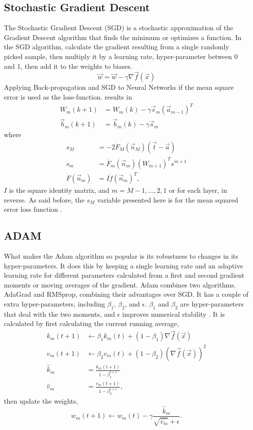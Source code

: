 \subsection{Stochastic Gradient Descent}\label{sec:SGD}

The Stochastic Gradient Descent (SGD) is a stochastic approximation of the Gradient Descent algorithm that finds the minimum or optimizes a function. In the SGD algorithm, calculate the gradient resulting from a single randomly picked sample, then multiply it by a learning rate, hyper-parameter between 0 and 1, then add it to the weights to biases. $$\vec{w}=\vec{w}-\gamma\nabla \vec{f}(\vec{x})$$ Applying Back-propagation and SGD to Neural Networks if the mean square error is used as the loss-function. results in 
\begin{align*}
W_{m}(k+1)&=W_{m}(k)-\gamma \vec{s}_m (\vec{a}_{m-1})^T\\
\vec{b}_m(k+1)&=\vec{b}_{m}(k)-\gamma \vec{s}_m
\end{align*} where
\begin{align*}
s_{M}&=-2\dot{F}_M(\vec{n}_M)(\vec{t}-\vec{a})\\
s_m&=\dot{F}_m(\vec{n}_m)(W_{m+1})^T s^{m+1}\\
\dot{F}(\vec{n}_m)&=I\dot{f}(\vec{n}_m)^T,
\end{align*} $I$ is the square identity matrix, and $m=M-1,\dots, 2, 1$ or for each layer, in reverse. As said before, the $s_M$ variable presented here is for the mean squared error loss function \cite{hagan_demuth_beale_jesus_orlando_de_2014}.

\subsection{ADAM}

What makes the Adam algorithm so popular is its robustness to changes in its hyper-parameters. It does this by keeping a single learning rate and an adaptive learning rate for different parameters calculated from a first and second gradient moments or moving averages of the gradient. Adam combines two algorithms. AdaGrad and RMSprop, combining their advantages over SGD. It has a couple of extra hyper-parameters, including $\beta_1$, $\beta_2$, and $\epsilon$. $\beta_1$ and $\beta_2$ are hyper-parameters that deal with the two moments, and $\epsilon$ improves numerical stability \cite{kingma_ba_2017}. It is calculated by first calculating the current running average, \begin{align*}
	k_m(t+1)&\leftarrow \beta_1 k_m(t)+(1-\beta_1)\nabla \vec{f}(\vec{x})\\
	v_m(t+1)&\leftarrow \beta_2 v_m(t)+(1-\beta_2)(\nabla \vec{f}(\vec{x}))^2\\
	\hat{k}_m&=\frac{k_m(t+1)}{1-\beta_1^{t+1}}\\
	\hat{v}_m&=\frac{v_m(t+1)}{1-\beta_2^{t+1}},
\end{align*} then update the weights, 
$$w_m(t+1)\leftarrow w_m(t)-\gamma\frac{\hat{k}_m}{\sqrt{\hat{v_m}}+\epsilon}.$$


